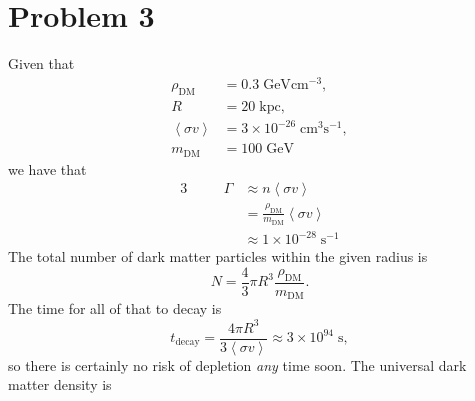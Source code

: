 \documentclass[12pt]{article}
\begin{document}
\section*{Problem 3}
Given that
\begin{align*}
    \rho_\text{DM} &= 0.3\;\text{GeV}\text{cm}^{-3}, \\
    R &= 20\;\text{kpc}, \\
    \left<\sigma v\right> &= 3\times10^{-26}\;\text{cm}^3\text{s}^{-1}, \\
    m_\text{DM} &= 100\;\text{GeV}
\end{align*}
we have that
\begin{alignat*}{3}
    & \quad & \Gamma &\approx n \left<\sigma v\right> \\
    & \quad &        &= \frac{\rho_\text{DM}}{m_\text{DM}}\left<\sigma v\right> \\
    & \quad &        &\approx  1\times10^{-28}\;\text{s}^{-1}
\end{alignat*}
The total number of dark matter particles within the given radius is
\[ N = \frac{4}{3}\pi R^3 \frac{\rho_\text{DM}}{m_\text{DM}}. \]
The time for all of that to decay is
\[ t_\text{decay} = \frac{4\pi R^3}{3 \left<\sigma v\right>} \approx 3\times10^{94}\;\text{s}, \]
so there is certainly no risk of depletion \textit{any} time soon.
The universal dark matter density is 
\end{document}
